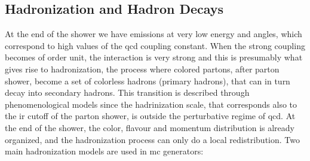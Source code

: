 \subsection{Hadronization and Hadron Decays}

At the end of the shower we have emissions at very low energy and angles, which correspond to high values of the \gls{qcd} coupling constant. 
When the strong coupling becomes of order unit, the interaction is very strong and this is presumably what gives rise to hadronization, the process where colored partons, after parton shower, become a set of colorless hadrons (primary hadrons), 
that can in turn decay into secondary hadrons. This transition is described through phenomenological models since the hadrinization scale, that corresponds also to the \gls{ir} cutoff of the parton shower, is outside the perturbative regime of \gls{qcd}. At the end of the shower, the color, flavour and momentum distribution is already organized, and the hadronization process can only do a local redistribution.
Two main hadronization models are used in \gls{mc} generators:

